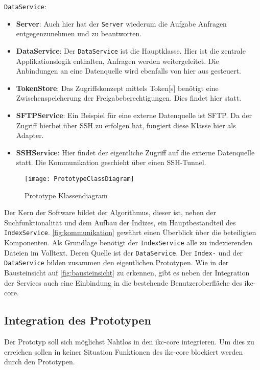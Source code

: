 \texttt{DataService}:
\begin{itemize}
    \item \textbf{Server}: Auch hier hat der \texttt{Server} wiederum die Aufgabe Anfragen entgegenzunehmen und zu beantworten.
    \item \textbf{DataService}: Der \texttt{DataService} ist die Hauptklasse. Hier ist die zentrale Applikationslogik enthalten, Anfragen werden weitergeleitet. Die Anbindungen an eine Datenquelle wird ebenfalls von hier aus gesteuert.
    \item \textbf{TokenStore}: Das Zugriffskonzept mittels \gls{Token}[s] benötigt eine Zwischenspeicherung der Freigabeberechtigungen. Dies findet hier statt. 
    \item \textbf{SFTPService}: Ein Beispiel für eine externe Datenquelle ist \gls{SFTP}. Da der Zugriff hierbei über \gls{SSH} zu erfolgen hat, fungiert diese Klasse hier als Adapter.
    \item \textbf{SSHService}: Hier findet der eigentliche Zugriff auf die externe Datenquelle statt. Die Kommunikation geschieht über einen \gls{SSH}-Tunnel.
\end{itemize}

    \begin{figure}[H]
    \centering
    \texttt{[image: PrototypeClassDiagram]}
    \caption{Prototype Klassendiagram}
    \label{fig:prototypeClassDiagram}
    \end{figure}

Der Kern der Software bildet der Algorithmus, dieser ist, neben der Suchfunktionalität und dem Aufbau der Indizes, ein Hauptbestandteil des \texttt{IndexService}. \autoref{fig:kommunikation} gewährt einen Überblick über die beteiligten Komponenten. Als Grundlage benötigt der \texttt{In\-dex\-Ser\-vice} alle zu indexierenden Dateien im Volltext. Deren Quelle ist der \texttt{Data\-Ser\-vice}. Der \texttt{Index-} und der \texttt{DataService} bilden zusammen den eigentlichen Prototypen. Wie in der Bausteinsicht auf \autoref{fig:bausteinsicht} zu erkennen, gibt es neben der Integration der Services auch eine Einbindung in die bestehende Benutzeroberfläche des \gls{ikc-core}.


\subsection{Integration des Prototypen}
Der Prototyp soll sich möglichst Nahtlos in den \gls{ikc-core} integrieren. Um dies zu erreichen sollen in keiner Situation Funktionen des \gls{ikc-core} blockiert werden durch den Prototypen. 


